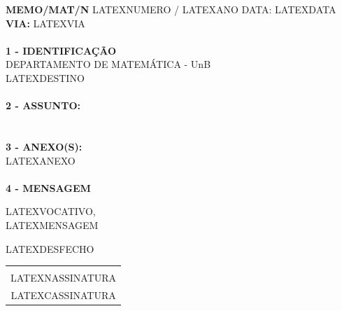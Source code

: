 \documentclass[12pt]{artigo}
\begin{document}
\vspace*{.8cm}
\timbrado
\setlength{\baselineskip}{5mm}
\noindent 
\begin{minipage}{16cm}
\vspace*{-8mm}
\parindent=1.2cm
\setlength{\baselineskip}{5mm}
\vspace*{.2cm}
\noindent
\small
{\bf  MEMO/MAT/N\primo} LATEXNUMERO / LATEXANO \hfill {DATA:} {LATEXDATA}
\vum \\
{\bf VIA:} {LATEXVIA}  
\\
\mbox{} \hrulefill\
\\
{\bf 1 - IDENTIFICA\c{C}\~AO} 
\\
\phantom{xxx}{\bf Proced\^encia:} {DEPARTAMENTO DE MATEM\'ATICA - UnB}
\\
 {LATEXDESTINO}
\\
\mbox{} \hrulefill\
\\
{\bf 2 - ASSUNTO:} \\
\phantom{xxx}{LATEXASSUNTO}
\\
\mbox{} \hrulefill\
\\
{\bf 3 - ANEXO(S):} 
\\
\phantom{xxx} {LATEXANEXO}
\\
\mbox{} \hrulefill\
\\
{ \bf 4 - MENSAGEM} 
\end{minipage}
\setlength{\baselineskip}{5mm}
\vspace*{.92cm} 

LATEXVOCATIVO,
\vspace*{8mm} \\
\noindent 
LATEXMENSAGEM 
\vspace*{8mm} 
\hspace*{8cm} 
\setlength{\baselineskip}{5mm}
\vspace*{10mm} 

LATEXDESFECHO
\vspace*{15mm} \\
\begin{center} 
\begin{tabular}{c}
\hline \vspace*{-3mm}\\
LATEXNASSINATURA \\
{\small LATEXCASSINATURA}
%
\end{tabular} 
\end{center}
\end{document}
